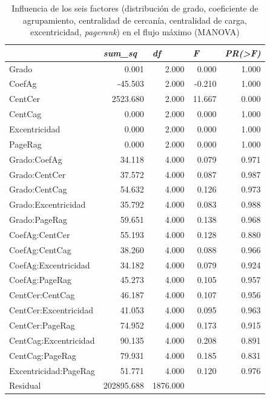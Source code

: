 \documentclass{article}
\begin{document}
\begin{table}[htbp]
  \centering
  \caption{Influencia de los seis factores (distribución de grado, coeficiente de agrupamiento, centralidad de cercanía, centralidad de carga, excentricidad, \textit{pagerank}) en el flujo máximo (MANOVA)}
    \begin{tabular}{lrrrr}
    \toprule
          & \multicolumn{1}{l}{\textit{\textbf{sum\_sq}}} & \multicolumn{1}{l}{\textit{\textbf{df}}} & \multicolumn{1}{l}{\textit{\textbf{F}}} & \multicolumn{1}{l}{\textit{\textbf{PR(>F)}}} \\
    \midrule
    Grado & 0.001 & 2.000 & 0.000 & 1.000 \\
    CoefAg & -45.503 & 2.000 & -0.210 & 1.000 \\
    CentCer & 2523.680 & 2.000 & 11.667 & 0.000 \\
    CentCag & 0.000 & 2.000 & 0.000 & 1.000 \\
    Excentricidad & 0.000 & 2.000 & 0.000 & 1.000 \\
    PageRag & 0.000 & 2.000 & 0.000 & 1.000 \\
    Grado:CoefAg & 34.118 & 4.000 & 0.079 & 0.971 \\
    Grado:CentCer & 37.572 & 4.000 & 0.087 & 0.987 \\
    Grado:CentCag & 54.632 & 4.000 & 0.126 & 0.973 \\
    Grado:Excentricidad & 35.792 & 4.000 & 0.083 & 0.988 \\
    Grado:PageRag & 59.651 & 4.000 & 0.138 & 0.968 \\
    CoefAg:CentCer & 55.193 & 4.000 & 0.128 & 0.880 \\
    CoefAg:CentCag & 38.260 & 4.000 & 0.088 & 0.966 \\
    CoefAg:Excentricidad & 34.182 & 4.000 & 0.079 & 0.924 \\
    CoefAg:PageRag & 45.273 & 4.000 & 0.105 & 0.957 \\
    CentCer:CentCag & 46.187 & 4.000 & 0.107 & 0.956 \\
    CentCer:Excentricidad & 41.053 & 4.000 & 0.095 & 0.963 \\
    CentCer:PageRag & 74.952 & 4.000 & 0.173 & 0.915 \\
    CentCag:Excentricidad & 90.135 & 4.000 & 0.208 & 0.891 \\
    CentCag:PageRag & 79.931 & 4.000 & 0.185 & 0.831 \\
    Excentricidad:PageRag & 51.771 & 4.000 & 0.120 & 0.976 \\
    Residual & 202895.688 & 1876.000 &       &  \\
    \bottomrule
    \end{tabular}%
  \label{tab:t33}%
\end{table}%
 
\end{document}
